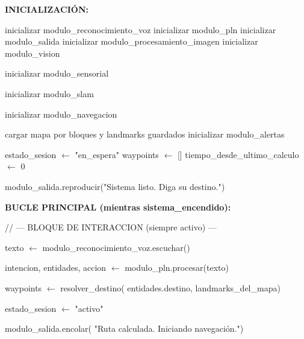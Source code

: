\begin{algorithmic}[1]

\Statex \textbf{INICIALIZACIÓN:}

\Statex inicializar modulo\_reconocimiento\_voz
\Statex inicializar modulo\_pln
\Statex inicializar modulo\_salida
\Statex inicializar modulo\_procesamiento\_imagen
\Statex inicializar modulo\_vision

\Statex inicializar modulo\_sensorial

\Statex inicializar modulo\_slam

\Statex inicializar modulo\_navegacion

\Statex cargar mapa por bloques y landmarks guardados
\Statex inicializar modulo\_alertas

\Statex

\Statex estado\_sesion $\gets$ "en\_espera"
\Statex waypoints $\gets$ []
\Statex tiempo\_desde\_ultimo\_calculo $\gets$ 0

\State modulo\_salida.reproducir("Sistema listo. Diga su destino.")

\Statex
\Statex \textbf{BUCLE PRINCIPAL (mientras sistema\_encendido):}

\Statex \hspace{0.5cm} // --- BLOQUE DE INTERACCION (siempre activo) ---

\State texto $\gets$ modulo\_reconocimiento\_voz.escuchar()


    \State intencion, entidades, accion $\gets$ modulo\_pln.procesar(texto)


        \State waypoints $\gets$ resolver\_destino(
        \Statex \hspace{2.3cm} entidades.destino,
        \Statex \hspace{2.3cm} landmarks\_del\_mapa)

        \State estado\_sesion $\gets$ "activo"

        \State modulo\_salida.encolar(
        \Statex \hspace{2.3cm} "Ruta calculada. Iniciando navegación.")

    \EndIf

    \Statex



\end{algorithmic}
